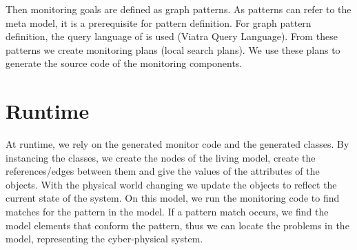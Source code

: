 Then monitoring goals are defined as graph patterns. 
As patterns can refer to the meta model, it is a prerequisite for pattern definition. 
For graph pattern definition, the query language of \viatra{} is used (Viatra Query Language). 
From these patterns we create monitoring plans (local search plans). 
We use these plans to generate the source code of the monitoring components.

\section{Runtime}

At runtime, we rely on the generated monitor code and the generated classes. 
By instancing the classes, we create the nodes of the living model, create the references/edges between them and give the values of the attributes of the objects. 
With the physical world changing we update the objects to reflect the current state of the system. 
On this model, we run the monitoring code to find matches for the pattern in the model. 
If a pattern match occurs, we find the model elements that conform the pattern, thus we can locate the problems in the model, representing the cyber-physical system.
